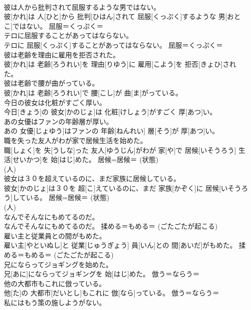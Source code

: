 \documentclass[8pt]{extreport}
\begin{document}
\begin{CJK}{UTF8}{min}
{\\	彼は人から批判されて屈服するような男ではない。	
\\	彼[かれ]は 人[ひと]から 批判[ひはん]されて 屈服[くっぷく]するような 男[おとこ]ではない。	屈服＝くっぷく＝ 
\\	テロに屈服することがあってはならない。	
\\	テロに 屈服[くっぷく]することがあってはならない。	屈服＝くっぷく＝ 
\\	彼は老齢を理由に雇用を拒否された。	
\\	彼[かれ]は 老齢[ろうれい]を 理由[りゆう]に 雇用[こよう]を 拒否[きょひ]された。	
\\	彼は老齢で腰が曲がっている。	
\\	彼[かれ]は 老齢[ろうれい]で 腰[こし]が 曲[ま]がっている。	
\\	今日の彼女は化粧がすごく厚い。	
\\	今日[きょう]の 彼女[かのじょ]は 化粧[けしょう]がすごく 厚[あつ]い。	
\\	あの女優はファンの年齢層が厚い。	
\\	あの 女優[じょゆう]はファンの 年齢[ねんれい] 層[そう]が 厚[あつ]い。	
\\	職を失った友人がわが家で居候生活を始めた。	
\\	職[しょく]を 失[うしな]った 友人[ゆうじん]がわが 家[や]で 居候[いそうろう] 生活[せいかつ]を 始[はじ]めた。	居候=居候＝ (状態) 
\\	(人) 
\\	彼女は３０を超えているのに、まだ家族に居候している。	
\\	彼女[かのじょ]は３０を 超[こ]えているのに、まだ 家族[かぞく]に 居候[いそうろう]している。	居候=居候＝ (状態) 
\\	(人) 
\\	なんでそんなにもめてるのだ。	
\\	なんでそんなにもめてるのだ。	揉める＝もめる＝ (ごたごたが起こる) 
\\	雇い主と従業員との間がもめた。	
\\	雇い主[やといぬし]と 従業[じゅうぎょう] 員[いん]との 間[あいだ]がもめた。	揉める＝もめる＝ (ごたごたが起こる) 
\\	兄にならってジョギングを始めた。	
\\	兄[あに]にならってジョギングを 始[はじ]めた。	倣う＝ならう＝ 
\\	他の大都市もこれに倣っている。	
\\	他[た]の 大都市[だいとし]もこれに 倣[なら]っている。	倣う＝ならう＝ 
\\	私にはもう策の施しようがない。	
}
\end{CJK}
\end{document}
